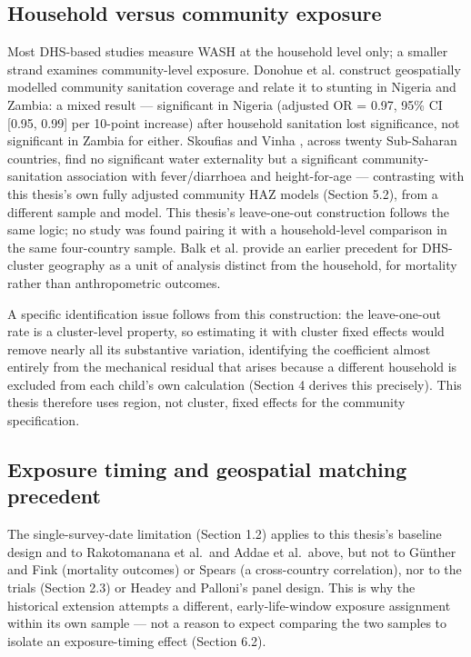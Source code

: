 \subsection{Household versus community exposure}\label{sec:2.4}

Most DHS-based studies measure WASH at the household level only; a smaller strand examines community-level exposure. Donohue et al. \autocite*{Donohue2023} construct geospatially modelled community sanitation coverage and relate it to stunting in Nigeria and Zambia: a mixed result --- significant in Nigeria (adjusted OR = 0.97, 95\% CI {[}0.95, 0.99{]} per 10-point increase) after household sanitation lost significance, not significant in Zambia for either. Skoufias and Vinha \autocite*{SkoufiasVinha2026}, across twenty Sub-Saharan countries, find no significant water externality but a significant community-sanitation association with fever/diarrhoea and height-for-age --- contrasting with this thesis's own fully adjusted community HAZ models (Section 5.2), from a different sample and model. This thesis's leave-one-out construction follows the same logic; no study was found pairing it with a household-level comparison in the same four-country sample. Balk et al. \autocite*{Balk2004} provide an earlier precedent for DHS-cluster geography as a unit of analysis distinct from the household, for mortality rather than anthropometric outcomes.

A specific identification issue follows from this construction: the leave-one-out rate is a cluster-level property, so estimating it with cluster fixed effects would remove nearly all its substantive variation, identifying the coefficient almost entirely from the mechanical residual that arises because a different household is excluded from each child's own calculation (Section 4 derives this precisely). This thesis therefore uses region, not cluster, fixed effects for the community specification.

\subsection{Exposure timing and geospatial matching precedent}\label{sec:2.5}

The single-survey-date limitation (Section 1.2) applies to this thesis's baseline design and to Rakotomanana et al.~and Addae et al.~above, but not to Günther and Fink (mortality outcomes) or Spears (a cross-country correlation), nor to the trials (Section 2.3) or Headey and Palloni's panel design. This is why the historical extension attempts a different, early-life-window exposure assignment within its own sample --- not a reason to expect comparing the two samples to isolate an exposure-timing effect (Section 6.2).

